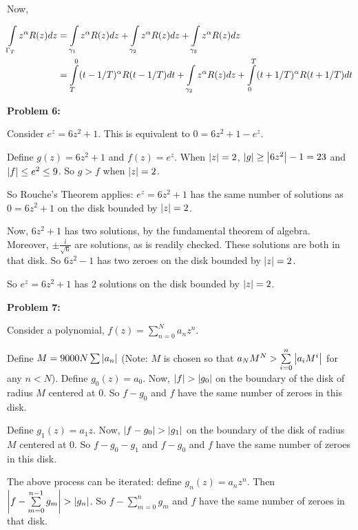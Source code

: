 \documentclass[a4paper,12pt]{article}
\begin{document}
\shunt %

Now,

\begin{align*}
\int\limits_{\Gamma_T} z^\alpha R(z) dz &= \int\limits_{\gamma_1} z^\alpha R(z) dz + \int\limits_{\gamma_2} z^\alpha R(z) dz + \int\limits_{\gamma_3} z^\alpha R(z) dz\\
&= \int\limits_T^0 (t-1/T)^\alpha R(t-1/T) dt + \int\limits_{\gamma_2} z^\alpha R(z) dz + \int\limits_0^T (t+1/T)^\alpha R(t+1/T) dt\\
\end{align*} %

\shunt

{\bf Problem 6:}

Consider $e^z = 6z^2 + 1$. This is equivalent to $0=6z^2 + 1 -e^z$.

Define $g(z) = 6z^2 +1$ and $f(z) = e^z$. When $\left\lvert z \right\rvert = 2$, $\left\lvert g \right\rvert \geq \left\lvert 6z^2 \right\rvert -1 = 23$ and $\left\lvert f \right\rvert \leq e^2 \leq 9$. So $g>f$ when $\left\lvert z \right\rvert = 2$.

So Rouche's Theorem applies: $e^z = 6z^2 +1$ has the same number of solutions as $0=6z^2 +1$ on the disk bounded by $\left\lvert z \right\rvert = 2$.

Now, $6z^2 +1$ has two solutions, by the fundamental theorem of algebra. Moreover, $\pm \frac{i}{\sqrt{6}}$ are solutions, as is readily checked. These solutions are both in that disk. So $6z^2-1$ has two zeroes on the disk bounded by $\left\lvert z \right\rvert = 2$.

So  $e^z = 6z^2 +1$ has $2$ solutions on the disk bounded by $\left\lvert z \right\rvert = 2$.

\shunt

{\bf Problem 7:}

Consider a polynomial, $f(z) = \sum\limits_{n=0}^N a_nz^n$.

Define $M = 9000N \sum \limits \left\lvert a_n \right\rvert$ (Note: $M$ is chosen so that $a_NM^N > \sum\limits_{i=0}^n \left\lvert a_iM^i \right\rvert$ for any $n <N$). Define $g_0(z) = a_0$. Now, $\left\lvert f \right\rvert > \left\lvert g_0 \right\rvert$ on the boundary of the disk of radius $M$ centered at $0$. So $f-g_0$ and $f$ have the same number of zeroes in this disk.

Define $g_1(z) = a_1z$. Now, $\left\lvert f-g_0 \right\rvert > \left\lvert g_1 \right\rvert$ on the boundary of the disk of radius $M$ centered at $0$. So $f-g_0-g_1$ and $f-g_0$ and $f$ have the same number of zeroes in this disk.

The above process can be iterated: define $g_n(z) = a_nz^n$. Then $\left\lvert f-\sum\limits_{m=0}^{n-1} g_m \right\rvert > \left\lvert g_n \right\rvert$. So $f-\sum\limits_{m=0}^{n} g_m$ and $f$ have the same number of zeroes in that disk.
\end{document}
